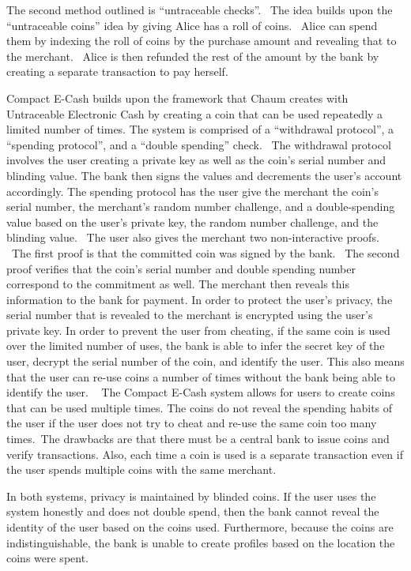 The second method outlined is ``untraceable checks''.  The idea builds upon the “untraceable coins” idea by giving Alice has a roll of coins.  Alice can spend them by indexing the roll of coins by the purchase amount and revealing that to the merchant.  Alice is then refunded the rest of the amount by the bank by creating a separate transaction to pay herself.

Compact E-Cash builds upon the framework that Chaum creates with Untraceable Electronic Cash by creating a coin that can be used repeatedly a limited number of times. The system is comprised of a “withdrawal protocol”, a “spending protocol”, and a “double spending” check.  The withdrawal protocol involves the user creating a private key as well as the coin’s serial number and blinding value. The bank then signs the values and decrements the user’s account accordingly. The spending protocol has the user give the merchant the coin’s serial number, the merchant’s random number challenge, and a double-spending value based on the user’s private key, the random number challenge, and the blinding value.  The user also gives the merchant two non-interactive proofs.  The first proof is that the committed coin was signed by the bank.  The second proof verifies that the coin’s serial number and double spending number correspond to the commitment as well. The merchant then reveals this information to the bank for payment. In order to protect the user’s privacy, the serial number that is revealed to the merchant is encrypted using the user’s private key. In order to prevent the user from cheating, if the same coin is used over the limited number of uses, the bank is able to infer the secret key of the user, decrypt the serial number of the coin, and identify the user. This also means that the user can re-use coins a number of times without the bank being able to identify the user.
 
The Compact E-Cash system allows for users to create coins that can be used multiple times. The coins do not reveal the spending habits of the user if the user does not try to cheat and re-use the same coin too many times. The drawbacks are that there must be a central bank to issue coins and verify transactions. Also, each time a coin is used is a separate transaction even if the user spends multiple coins with the same merchant.

In both systems, privacy is maintained by blinded coins. If the user uses the system honestly and does not double spend, then the bank cannot reveal the identity of the user based on the coins used. Furthermore, because the coins are indistinguishable, the bank is unable to create profiles based on the location the coins were spent.

